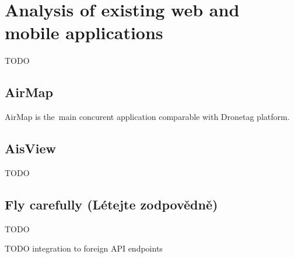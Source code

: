 \chapter{Analysis of existing web and mobile applications}\label{ch:analysis-of-existing-web-and-mobile-applications}

TODO

\section{AirMap}\label{sec:airmap}
AirMap is the~main concurent application comparable with Dronetag platform.%

\section{AisView}\label{sec:aisview}
TODO

\section{Fly carefully (L{\' e}tejte zodpov{\v e}dn{\v e})}\label{sec:fly-carefully}
TODO


TODO integration to foreign API endpoints

